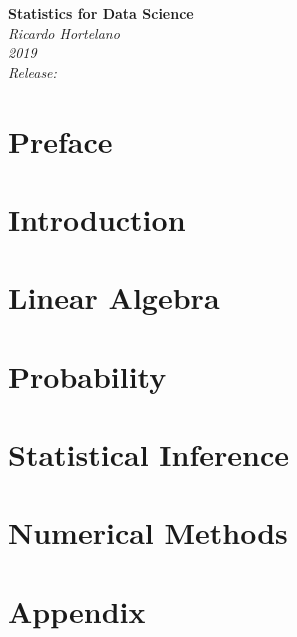 \documentclass[12pt]{book}
\begin{document}
\begin{titlepage}
    \begin{center}
       \Large\textbf{Statistics for Data Science}\\
       \large\textit{Ricardo Hortelano}\\
       \textit{2019}\\
       \vspace*{3\baselineskip}
       \textit{Release:}\\
       \textit{}
    \end{center}
 \end{titlepage}

\tableofcontents

\chapter*{Preface}


\chapter*{Introduction}


\chapter{Linear Algebra}


\chapter{Probability}


\chapter{Statistical Inference}


\chapter{Numerical Methods}


\appendix
\chapter{Appendix}


\printbibliography
\end{document}
